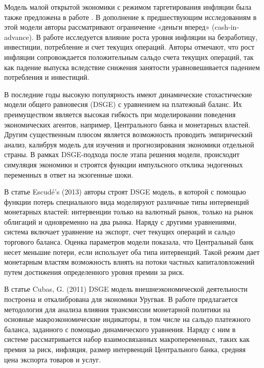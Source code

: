 \documentclass[a4paper, 14pt]{extarticle}
\begin{document}
Модель малой открытой экономики с режимом таргетирования инфляции была также предложена в работе \autocite{mansoorian2006employment}.
В дополнение к предшествующим исследованиям в этой модели авторы рассматривают ограничение «деньги вперед» (cash-in-advance). 
В работе исследуется влияние роста уровня инфляции на безработицу, инвестиции, потребление и счет текущих операций. 
Авторы отмечают, что рост инфляции сопровождается положительным сальдо счета текущих операций, так как падение выпуска вследствие снижения занятости уравновешивается падением потребления и инвестиций.

В последние годы высокую популярность имеют динамические стохастические модели общего равновесия (DSGE) с уравнением на платежный баланс.
Их преимуществом является высокая гибкость при моделировании поведения экономических агентов, например, Центрального банка и монетарных властей.
Другим существенным плюсом является возможность проводить эмпирический анализ, калибруя модель для изучения и прогнозирования экономики отдельной страны. 
В рамках DSGE-подхода после этапа решения модели, происходит симуляция экономики и строятся функции импульсного отклика эндогенных переменных в ответ на экзогенные шоки.

В статье Escudé’s (2013) \autocite{escude2013dsge} авторы строят DSGE модель, в которой с помощью функции потерь специального вида моделируют различные типы интервенций монетарных властей: интервенции только на валютный рынок, только на рынок облигаций и одновременно на два рынка. 
Наряду с другими уравнениями, система включает уравнение на экспорт, счет текущих операций и сальдо торгового баланса. 
Оценка параметров модели показала, что Центральный банк несет меньшие потери, если использует оба типа интервенций. 
Такой режим дает монетарным властям возможность влиять на потоки частных капиталовложений путем достижения определенного уровня премии за риск.

В статье Cubas, G. (2011) \autocite{cubas2011dynamic} DSGE модель внешнеэкономической деятельности построена и откалибрована для экономики Уругвая. 
В работе предлагается методология для анализа влияния трансмиссии монетарной политики на основные макроэкономические индикаторы, в том числе на сальдо платежного баланса, заданного с помощью динамического уравнения. 
Наряду с ним в системе рассматривается набор взаимосвязанных макропеременных, таких как премия за риск, инфляция, размер интервенций Центрального банка, средняя цена экспорта товаров и услуг.
\end{document}
